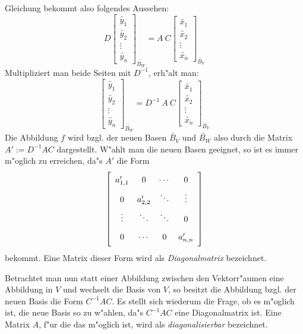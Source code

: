 Gleichung  bekommt also folgendes Aussehen:
\[
    D
    \left[
        \begin{array}{c} 
            \tilde{y_1}\\ 
            \tilde{y_2}\\ \vdots \\
            \tilde{y_n}
        \end{array}
    \right]_{\tilde{B_W}}
    =
    A \: C
    \left[
        \begin{array}{c} 
            \tilde{x_1}\\ 
            \tilde{x_2}\\ \vdots \\
            \tilde{x_n}
        \end{array}
    \right]_{\tilde{B_V}}
\]
Multipliziert man beide Seiten mit $D^{-1}$, erh"alt man:
\[
    \left[
        \begin{array}{c} 
            \tilde{y_1}\\ 
            \tilde{y_2}\\ \vdots \\
            \tilde{y_n}
        \end{array}
    \right]_{\tilde{B_W}}
    =
    D^{-1} \: A \: C
    \left[
        \begin{array}{c} 
            \tilde{x_1}\\ 
            \tilde{x_2}\\ \vdots \\
            \tilde{x_n}
        \end{array}
    \right]_{\tilde{B_V}}
\]
Die Abbildung $f$ wird bzgl. der neuen Basen $\tilde{B_V}$ und $\tilde{B_W}$
also durch die Matrix $A':=D^{-1}AC$ dargestellt. W"ahlt man die neuen 
Basen geeignet, so ist es immer m"oglich zu erreichen, da"s 
$A'$ die Form
\[ \left[
   \begin{array}{cccc}
       a_{1,1}' & 0        & \cdots & 0        \MatStrut \\
       0        & a_{2,2}' & \ddots & \vdots   \MatStrut \\
       \vdots   & \ddots   & \ddots & 0        \MatStrut \\
       0        & \cdots   & 0      & a_{n,n}' \MatStrut
   \end{array} \right]
\] bekommt. Eine Matrix dieser Form wird als 
{\em Diagonalmatrix}  bezeichnet.

Betrachtet man nun statt einer Abbildung zwischen den
Vektorr"aumen eine Abbildung in $V$ und wechselt die Basis von $V$, so
besitzt die Abbildung bzgl. der neuen Basis die Form $C^{-1}AC$.
Es stellt sich wiederum die Frage, ob es m"oglich ist, die neue Basis
so zu w"ahlen, da"s $C^{-1}AC$ eine Diagonalmatrix ist. Eine Matrix $A$,
f"ur die das m"oglich ist, wird als
{\em diagonalisierbar}  bezeichnet.

